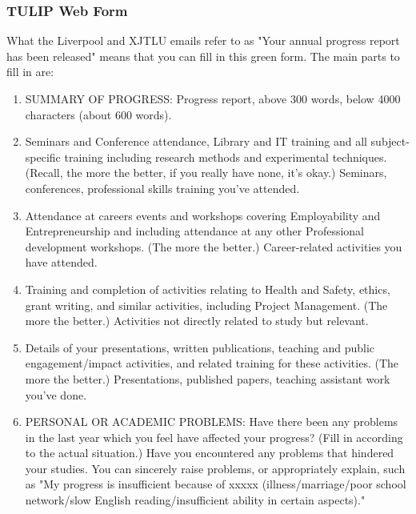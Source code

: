 \subsubsection{TULIP Web Form}
What the Liverpool and XJTLU emails refer to as "Your annual progress report has been released" means that you can fill in this green form. The main parts to fill in are:
\begin{enumerate}
    \item SUMMARY OF PROGRESS: Progress report, above 300 words, below 4000 characters (about 600 words).
    \item Seminars and Conference attendance, Library and IT training and all subject-specific training including research methods and experimental techniques. (Recall, the more the better, if you really have none, it's okay.) Seminars, conferences, professional skills training you've attended.
    \item Attendance at careers events and workshops covering Employability and Entrepreneurship and including attendance at any other Professional development workshops. (The more the better.) Career-related activities you have attended.
    \item Training and completion of activities relating to Health and Safety, ethics, grant writing, and similar activities, including Project Management. (The more the better.) Activities not directly related to study but relevant.
    \item Details of your presentations, written publications, teaching and public engagement/impact activities, and related training for these activities. (The more the better.) Presentations, published papers, teaching assistant work you've done.
    \item PERSONAL OR ACADEMIC PROBLEMS: Have there been any problems in the last year which you feel have affected your progress? (Fill in according to the actual situation.) Have you encountered any problems that hindered your studies. You can sincerely raise problems, or appropriately explain, such as "My progress is insufficient because of xxxxx (illness/marriage/poor school network/slow English reading/insufficient ability in certain aspects)."
\end{enumerate}

